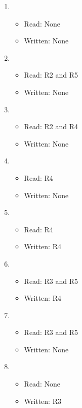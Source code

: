 \documentclass[12pt,letterpaper]{hmcpset}
\begin{document}
\begin{solution}
\begin{enumerate}[label=Cycle \arabic*]
\item
\begin{itemize}
\item Read: None
\item Written: None
\end{itemize}

\item
\begin{itemize}
\item Read: R2 and R5
\item Written: None
\end{itemize}

\item
\begin{itemize}
\item Read: R2 and R4
\item Written: None
\end{itemize}

\item 
\begin{itemize}
\item Read: R4
\item Written: None
\end{itemize}

\item
\begin{itemize}
\item Read: R4
\item Written: R4
\end{itemize}

\item
\begin{itemize}
\item Read: R3 and R5
\item Written: R4
\end{itemize}

\item
\begin{itemize}
\item Read: R3 and R5
\item Written: None
\end{itemize}

\item
\begin{itemize}
\item Read: None
\item Written: R3
\end{itemize}


\end{enumerate}
\end{solution}
\end{document}
